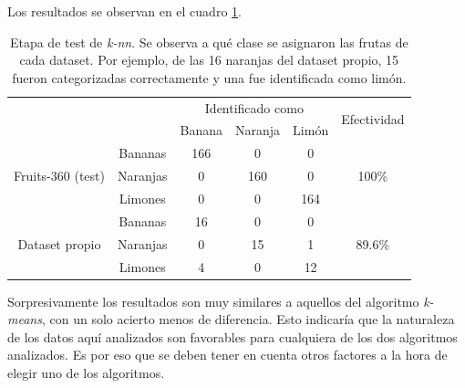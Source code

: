 \documentclass[10pt, a4paper]{article}
\begin{document}
Los resultados se observan en el cuadro \ref{tab:k_nn_results}.

\begin{table}[h]
\begin{center}
\caption{Etapa de test de \textit{k-nn}. Se observa a qué clase se asignaron las frutas de cada dataset. Por ejemplo, de las 16 naranjas del dataset propio, 15 fueron categorizadas correctamente y una fue identificada como limón.}
    
\begin{tabular}{|c|c|c|c|c|c|}
\hline
\multirow{2}{*}{}                  & \multirow{2}{*}{} & \multicolumn{3}{c|}{Identificado como} & \multirow{2}{*}{Efectividad} \\ \cline{3-5}
                                   &                   & Banana      & Naranja      & Limón     &                              \\ \hline
\multirow{3}{*}{Fruits-360 (test)} & Bananas           & 166         & 0            & 0         & \multirow{3}{*}{100\%}       \\ \cline{2-5}
                                   & Naranjas          & 0           & 160          & 0         &                              \\ \cline{2-5}
                                   & Limones           & 0           & 0            & 164       &                              \\ \hline
\multirow{3}{*}{Dataset propio}    & Bananas           & 16          & 0            & 0         & \multirow{3}{*}{89.6\%}      \\ \cline{2-5}
                                   & Naranjas          & 0           & 15           & 1         &                              \\ \cline{2-5}
                                   & Limones           & 4           & 0            & 12        &                              \\ \hline
\end{tabular}
\label{tab:k_nn_results}
\end{center}
\end{table}

Sorpresivamente los resultados son muy similares a aquellos del algoritmo \textit{k-means}, con un solo acierto menos de diferencia. Esto indicaría que la naturaleza de los datos aquí analizados son favorables para cualquiera de los dos algoritmos analizados. Es por eso que se deben tener en cuenta otros factores a la hora de elegir uno de los algoritmos. 
\end{document}

